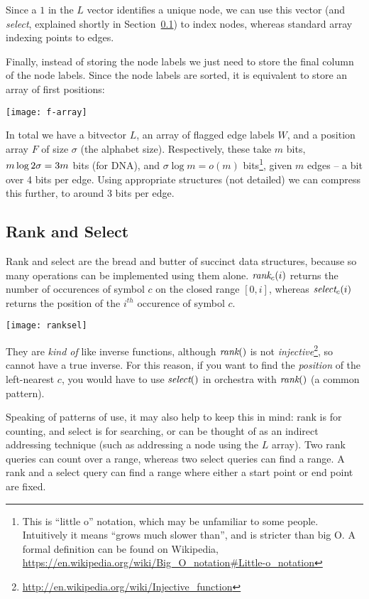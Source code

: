 Since a $1$ in the $L$ vector identifies a unique node, we can use this vector (and \emph{select}, explained shortly in Section~\ref{bl-sec:ras}) to index nodes, whereas standard array indexing points to edges.

Finally, instead of storing the node labels we just need to store the final column of the node labels. Since the node labels are sorted, it is equivalent to store an array of first positions:

\medskip\centerline{\texttt{[image: f-array]}}\medskip

In total we have a bitvector $L$, an array of flagged edge labels $W$, and a position array $F$ of size $\sigma$ (the alphabet size). Respectively, these take $m$ bits, $m\log{2\*\sigma}=3m$ bits (for DNA), and $\sigma \log{m} = o(m)$ bits\footnote{This is “little o” notation, which may be unfamiliar to some people. Intuitively it means “grows much slower than”, and is stricter than big O. A formal definition can be found on Wikipedia, \url{https://en.wikipedia.org/wiki/Big_O_notation\#Little-o_notation}}, given $m$ edges -- a bit over 4 bits per edge. Using appropriate structures (not detailed) we can compress this further, to around 3 bits per edge.

\subsection{Rank and Select}\label{bl-sec:ras}

Rank and select are the bread and butter of succinct data structures, because so many operations can be implemented using them alone. $\textit{rank}_c(i)$ returns the number of occurences of symbol $c$ on the closed range $[0,i]$, whereas $\textit{select}_c(
i)$  returns the position of the $i^{th}$ occurence of symbol $c$.

\medskip\centerline{\texttt{[image: ranksel]}}\medskip

They are \emph{kind of} like inverse functions, although $\textit{rank}()$ is not \emph{injective}\footnote{\url{http://en.wikipedia.org/wiki/Injective_function}}, so cannot have a true inverse. For this reason, if you want to find the \emph{position} of the left-nearest $c$, you would have to use $\textit{select}()$ in orchestra with $\textit{rank}()$ (a common pattern).

Speaking of patterns of use, it may also help to keep this in mind: rank is for counting, and select is for searching, or can be thought of as an indirect addressing technique (such as addressing a node using the $L$ array). Two rank queries can count over a range, whereas two select queries can find a range. A rank and a select query can find a range where either a start point or end point are fixed.


